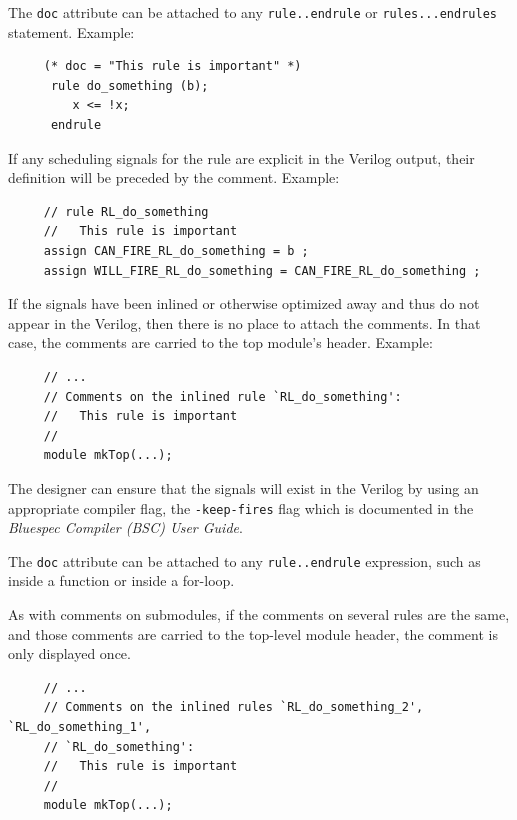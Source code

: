\documentclass[twoside,letterpaper]{article}
\newcommand{\BSCUserGuideFullName}{\emph{Bluespec Compiler (BSC) User Guide}}
\newcommand{\te}[1]{\texttt{#1}}
\begin{document}
The \te{doc} attribute can be attached to any \te{rule..endrule} or
\te{rules...endrules} statement. Example: 
\begin{verbatim}
     (* doc = "This rule is important" *)
      rule do_something (b);
         x <= !x;
      endrule
\end{verbatim}
If any scheduling signals for the rule are explicit in the Verilog
output, their definition will be preceded by the comment.  Example:
\begin{verbatim}
     // rule RL_do_something
     //   This rule is important
     assign CAN_FIRE_RL_do_something = b ;
     assign WILL_FIRE_RL_do_something = CAN_FIRE_RL_do_something ;
\end{verbatim}
If the signals have been inlined or otherwise optimized away and thus
do not appear in the Verilog, then there is no place to attach the
comments.  In that case, the comments are carried to the top module's
header.  Example:
\begin{verbatim}
     // ...
     // Comments on the inlined rule `RL_do_something':
     //   This rule is important
     //
     module mkTop(...);
\end{verbatim}
The designer can ensure that the signals will exist in the Verilog
by using an appropriate compiler flag, the \te{-keep-fires} flag which
is documented in the {\BSCUserGuideFullName}.

The \te{doc} attribute can be attached to any \te{rule..endrule} expression,
such as inside a function or inside a for-loop.

As with comments on submodules, if the  comments on several rules are the
same, and those comments are carried to the top-level module header, the comment is only displayed once.
\begin{verbatim}
     // ...
     // Comments on the inlined rules `RL_do_something_2', `RL_do_something_1',
     // `RL_do_something':
     //   This rule is important
     //
     module mkTop(...);
\end{verbatim}

\end{document}
